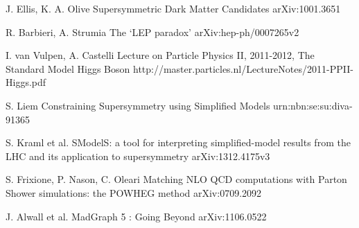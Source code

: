 
\begin{thebibliography}{2}

\singlespace

             {J. Ellis, K. A. Olive}
             {Supersymmetric Dark Matter Candidates}
             {arXiv:1001.3651}


             {R. Barbieri, A. Strumia}
             {The `LEP paradox'}
             {arXiv:hep-ph/0007265v2}

             {I. van Vulpen, A. Castelli}
             {Lecture on Particle Physics II, 2011-2012, The Standard Model Higgs Boson}
             {http://master.particles.nl/LectureNotes/2011-PPII-Higgs.pdf}




             {S. Liem}
             {Constraining Supersymmetry using Simplified Models}
             {urn:nbn:se:su:diva-91365}

             {S. Kraml et al.}
             {SModelS: a tool for interpreting simplified-model results from the LHC and its application to supersymmetry}
             {arXiv:1312.4175v3}


             {S. Frixione, P. Nason, C. Oleari}
             {Matching NLO QCD computations with Parton Shower simulations: the POWHEG method}
             {arXiv:0709.2092}

             {J. Alwall et al.}
             {MadGraph 5 : Going Beyond}
             {arXiv:1106.0522}


\end{thebibliography}
